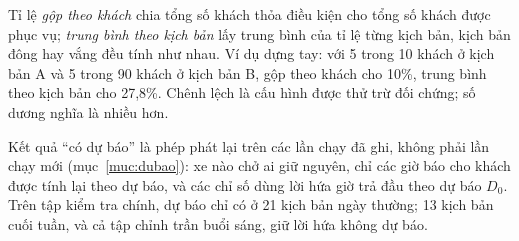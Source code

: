 Tỉ lệ \emph{gộp theo khách} chia tổng số khách thỏa điều kiện cho tổng số khách được phục vụ; \emph{trung bình theo
kịch bản} lấy trung bình của tỉ lệ từng kịch bản, kịch bản đông hay vắng đều tính như nhau. Ví dụ dựng tay: với 5
trong 10 khách ở kịch bản A và 5 trong 90 khách ở kịch bản B, gộp theo khách cho 10\%, trung bình theo kịch bản cho
27,8\%. Chênh lệch là cấu hình được thử trừ đối chứng; số dương nghĩa là nhiều hơn.

Kết quả ``có dự báo'' là phép phát lại trên các lần chạy đã ghi, không phải lần chạy mới (mục~\ref{muc:dubao}): xe
nào chở ai giữ nguyên, chỉ các giờ báo cho khách được tính lại theo dự báo, và các chỉ số dùng lời hứa giờ trả đầu
theo dự báo $D_0$. Trên tập kiểm tra chính, dự báo chỉ có ở 21 kịch bản ngày thường; 13 kịch bản cuối tuần, và cả
tập chỉnh trần buổi sáng, giữ lời hứa không dự báo.

